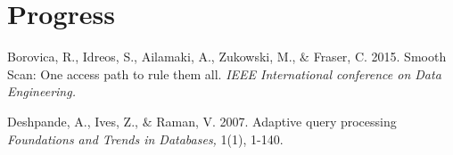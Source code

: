 \documentclass[a4paper,11pt,titlepage]{article}
\begin{document}
\section{Progress}

\begin{thebibliography}{9}

	 Borovica, R., Idreos, S., Ailamaki, A., Zukowski, M., $\&$ Fraser, C.
	2015.	
 	Smooth Scan: One access path to rule them all.
	\emph{IEEE International conference on Data Engineering.}

	Deshpande, A., Ives, Z., $\&$ Raman, V.
	2007.
	Adaptive query processing
	\emph{Foundations and Trends in Databases,}
	1(1), 1-140.
\end{thebibliography}
\end{document}
